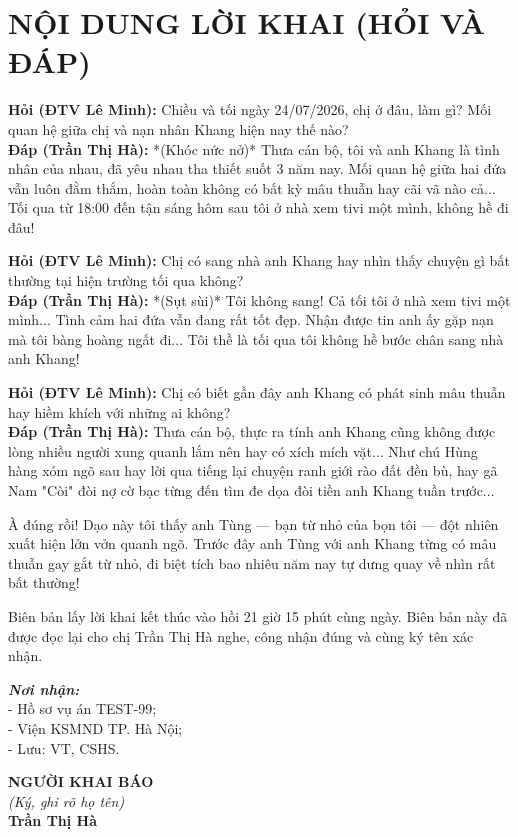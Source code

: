 \documentclass[12pt,a4paper]{article}
\begin{document}
\section*{NỘI DUNG LỜI KHAI (HỎI VÀ ĐÁP)}

\noindent \textbf{Hỏi (ĐTV Lê Minh):} Chiều và tối ngày 24/07/2026, chị ở đâu, làm gì? Mối quan hệ giữa chị và nạn nhân Khang hiện nay thế nào?\\
\textbf{Đáp (Trần Thị Hà):} *(Khóc nức nở)* Thưa cán bộ, tôi và anh Khang là tình nhân của nhau, đã yêu nhau tha thiết suốt 3 năm nay. Mối quan hệ giữa hai đứa vẫn luôn đằm thắm, hoàn toàn không có bất kỳ mâu thuẫn hay cãi vã nào cả... Tối qua từ 18:00 đến tận sáng hôm sau tôi ở nhà xem tivi một mình, không hề đi đâu!

\noindent \textbf{Hỏi (ĐTV Lê Minh):} Chị có sang nhà anh Khang hay nhìn thấy chuyện gì bất thường tại hiện trường tối qua không?\\
\textbf{Đáp (Trần Thị Hà):} *(Sụt sùi)* Tôi không sang! Cả tối tôi ở nhà xem tivi một mình... Tình cảm hai đứa vẫn đang rất tốt đẹp. Nhận được tin anh ấy gặp nạn mà tôi bàng hoàng ngất đi... Tôi thề là tối qua tôi không hề bước chân sang nhà anh Khang!

\noindent \textbf{Hỏi (ĐTV Lê Minh):} Chị có biết gần đây anh Khang có phát sinh mâu thuẫn hay hiềm khích với những ai không?\\
\textbf{Đáp (Trần Thị Hà):} Thưa cán bộ, thực ra tính anh Khang cũng không được lòng nhiều người xung quanh lắm nên hay có xích mích vặt... Như chú Hùng hàng xóm ngõ sau hay lời qua tiếng lại chuyện ranh giới rào đất đền bù, hay gã Nam "Còi" đòi nợ cờ bạc từng đến tìm đe dọa đòi tiền anh Khang tuần trước... 

À đúng rồi! Dạo này tôi thấy anh Tùng — bạn từ nhỏ của bọn tôi — đột nhiên xuất hiện lởn vởn quanh ngõ. Trước đây anh Tùng với anh Khang từng có mâu thuẫn gay gắt từ nhỏ, đi biệt tích bao nhiêu năm nay tự dưng quay về nhìn rất bất thường!

\noindent Biên bản lấy lời khai kết thúc vào hồi 21 giờ 15 phút cùng ngày. Biên bản này đã được đọc lại cho chị Trần Thị Hà nghe, công nhận đúng và cùng ký tên xác nhận.

\vspace{0.8cm}

\noindent
\begin{minipage}[t]{0.45\textwidth}
    \small
    \textbf{\textit{Nơi nhận:}}\\
    - Hồ sơ vụ án TEST-99;\\
    - Viện KSMND TP. Hà Nội;\\
    - Lưu: VT, CSHS.
\end{minipage}
\hfill
\begin{minipage}[t]{0.5\textwidth}
    \begin{center}
        \small
        \textbf{NGƯỜI KHAI BÁO}\\
        \textit{(Ký, ghi rõ họ tên)}\\[1.5cm]
        \textbf{Trần Thị Hà}
    \end{center}
\end{minipage}
\end{document}

